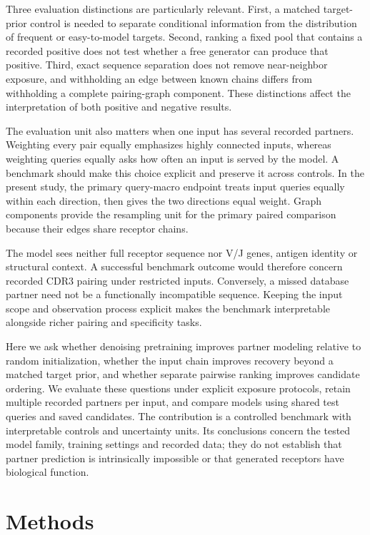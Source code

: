 \documentclass[a4paper,11pt]{article}
\begin{document}
Three evaluation distinctions are particularly relevant. First, a matched
target-prior control is needed to separate conditional information from the
distribution of frequent or easy-to-model targets. Second, ranking a fixed
pool that contains a recorded positive does not test whether a free generator
can produce that positive. Third, exact sequence separation does not remove
near-neighbor exposure, and withholding an edge between known chains differs
from withholding a complete pairing-graph component. These distinctions
affect the interpretation of both positive and negative results.

The evaluation unit also matters when one input has several recorded
partners. Weighting every pair equally emphasizes highly connected inputs,
whereas weighting queries equally asks how often an input is served by the
model. A benchmark should make this choice explicit and preserve it across
controls. In the present study, the primary query-macro endpoint treats input
queries equally within each direction, then gives the two directions equal
weight. Graph components provide the resampling unit for the primary paired
comparison because their edges share receptor chains.

The model sees neither full receptor sequence nor V/J genes, antigen identity
or structural context. A successful benchmark outcome would therefore concern
recorded CDR3 pairing under restricted inputs. Conversely, a missed database
partner need not be a functionally incompatible sequence. Keeping the input
scope and observation process explicit makes the benchmark interpretable
alongside richer pairing and specificity tasks.

Here we ask whether denoising pretraining improves partner modeling relative
to random initialization, whether the input chain improves recovery beyond a
matched target prior, and whether separate pairwise ranking improves candidate
ordering. We evaluate these questions under explicit exposure protocols,
retain multiple recorded partners per input, and compare models using shared
test queries and saved candidates. The contribution is a controlled benchmark
with interpretable controls and uncertainty units. Its conclusions concern the
tested model family, training settings and recorded data; they do not establish
that partner prediction is intrinsically impossible or that generated receptors
have biological function.

\section{Methods}
\end{document}
